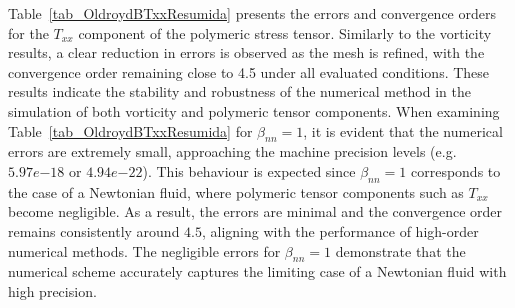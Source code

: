\documentclass[preprint, 12pt]{elsarticle}
\begin{document}
Table~\ref{tab_OldroydBTxxResumida} presents the errors and convergence orders
for the $T_{xx}$ component of the polymeric stress tensor. Similarly to the
vorticity results, a clear reduction in errors is observed as the mesh is
refined, with the convergence order remaining close to 4.5 under all evaluated
conditions. These results indicate the stability and robustness of the
numerical method in the simulation of both vorticity and polymeric tensor
components. When examining Table~\ref{tab_OldroydBTxxResumida} for $\beta_{nn}
= 1$, it is evident that the numerical errors are extremely small, approaching
the machine precision levels (e.g. $5.97e{-18}$ or $4.94e{-22}$). This
behaviour is expected since $\beta_{nn} = 1$ corresponds to the case of a
Newtonian fluid, where polymeric tensor components such as $T_{xx}$ become
negligible. As a result, the errors are minimal and the convergence order
remains consistently around $4.5$, aligning with the performance of high-order
numerical methods. The negligible errors for $\beta_{nn} = 1$ demonstrate that
the numerical scheme accurately captures the limiting case of a Newtonian fluid
with high precision.
\end{document}
